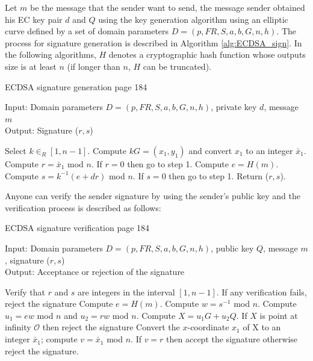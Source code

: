 Let $m$ be the message that the sender want to send, the message sender obtained his EC key pair $d$ and $Q$ using the key generation algorithm using an elliptic curve defined by a set of domain parameters $D=(p,FR,S,a,b,G,n,h)$. The process for signature generation is described in Algorithm \ref{alg:ECDSA_sign}. In the following algorithms, $H$ denotes a cryptographic hash function whose outputs size is at least $n$ (if longer than $n$, $H$ can be truncated).

\begin{algorithm}[H] 
	\caption{ECDSA signature generation \cite{hankerson2006guide} page 184}
		Input: Domain parameters $D=(p,FR,S,a,b,G,n,h)$, private key $d$, message $m$ \\
		Output:  Signature ($r,s$)
	\label{alg:ECDSA_sign}
	\begin{algorithmic} [1]
		\STATE Select $k \in _R \left[ 1, n-1 \right] $.
		\STATE Compute $kG=(x_1,y_1)$ and convert $x_1$ to an integer $\bar{x}_1$.
		\STATE Compute $r = \bar{x}_1$ mod $n$. If $r = 0$ then go to step 1.
		\STATE Compute $e = H(m)$.
		\STATE Compute $s = k^{-1}(e+dr)$ mod $n$. If $s=0$ then go to step 1.
		\STATE Return ($r,s$).
	\end{algorithmic}
\end{algorithm}
Anyone can verify the sender signature by using the sender's public key and the verification process is described as follows:
\begin{algorithm}[H] 
	\caption{ECDSA signature verification \cite{hankerson2006guide} page 184}
	Input: Domain parameters $D=(p,FR,S,a,b,G,n,h)$, public key $Q$, message $m$, signature ($r,s$) \\
	Output:  Acceptance or rejection of the signature
	\label{alg:ECDSA_verify}
	\begin{algorithmic} [1]
		\STATE Verify that $r$ and $s$ are integers in the interval $[1,n-1]$. If any verification fails, reject the signature
		\STATE Compute $e = H(m)$.
		\STATE Compute $w=s^{-1}$ mod $n$.
		\STATE Compute $u_1 = ew$ mod $n$ and $u_2=rw$ mod $n$.
		\STATE Compute $X = u_1G+u_2Q$.
		\STATE If $X$ is point at infinity $\mathcal{O}$ then reject the signature
		\STATE Convert the $x$-coordinate $x_1$ of X to an integer $\bar{x}_1$; compute $v=\bar{x}_1$ mod $n$.
		\STATE If $v=r$ then accept the signature otherwise reject the signature.
	\end{algorithmic}
\end{algorithm}

